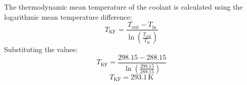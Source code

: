 The thermodynamic mean temperature of the coolant is calculated using the logarithmic mean temperature difference:  
\[
T_{\text{KF}} = \frac{T_{\text{out}} - T_{\text{in}}}{\ln \left( \frac{T_{\text{out}}}{T_{\text{in}}} \right)}
\]  
Substituting the values:  
\[
T_{\text{KF}} = \frac{298.15 - 288.15}{\ln \left( \frac{298.15}{288.15} \right)}
\]  
\[
T_{\text{KF}} = 293.1 \, \text{K}
\]